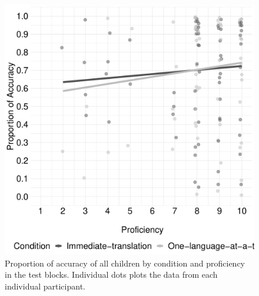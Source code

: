 \documentclass[
  man,floatsintext]{apa7}
\begin{document}
\begin{figure}

{\centering \includegraphics[width=0.5\linewidth]{TabletSwitch_supplemental_files/figure-latex/FigureS6-1} 

}

\caption{Proportion of accuracy of all children by condition and proficiency in the test blocks. Individual dots plots the data from each individual participant.}\label{fig:FigureS6}
\end{figure}
\end{document}
